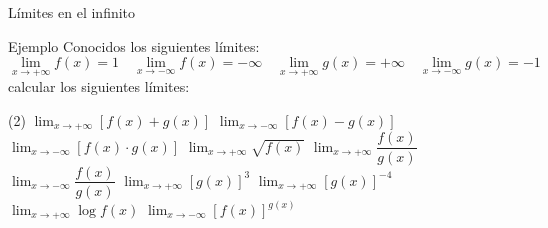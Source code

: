 \documentclass[8pt,handout]{beamer}
\newcommand{\limite}[2]{\displaystyle \lim_{x \rightarrow #1}{#2}}
\begin{document}
\begin{frame}{Límites en el infinito}
\begin{exampleblock}{Ejemplo}
Conocidos los siguientes límites:
\[ \limite{+\infty}{f(x)}=1 \quad \limite{-\infty}{f(x)}=-\infty \quad \limite{+\infty}{g(x)}=+\infty \quad \limite{-\infty}{g(x)}=-1 \]
calcular los siguientes límites:
\begin{tasks}[label=\alph*)](2)
\task $\limite{+\infty}{\left[ f(x)+g(x) \right] }$
\task $\limite{-\infty}{\left[ f(x)-g(x) \right] }$
\task $\limite{-\infty}{\left[ f(x)\cdot g(x) \right] }$
\task $\limite{+\infty}{\sqrt{ f(x)} }$
\task $\limite{+\infty}{\dfrac{f(x)}{g(x)} }$
\task $\limite{-\infty}{\dfrac{f(x)}{g(x)} }$
\task $\limite{+\infty}{\left[ g(x) \right]^3 }$
\task $\limite{+\infty}{\left[ g(x) \right]^{-4} }$
\task $\limite{+\infty}{\log f(x) }$
\task $\limite{-\infty}{\left[ f(x) \right]^{g(x)} }$
\end{tasks}
\end{exampleblock}
\end{frame}
\end{document}
